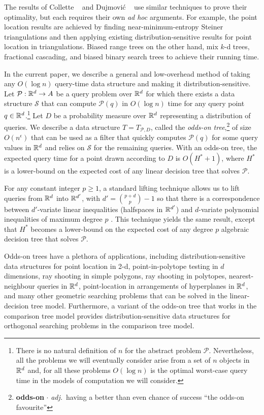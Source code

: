 \documentclass{patmorin}
\newcommand{\eps}{\epsilon}
\begin{document}
The results of Collette \etal\ \cite{cdilm08,cdilm09} and Dujmovi\'c
\etal\ \cite{dhm09} use similar techniques to prove their optimality,
but each requires their own \textit{ad hoc} arguments.  For example, the point
location results are achieved by finding near-minimum-entropy Steiner
triangulations and then applying existing distribution-sensitive results
for point location in triangulations.  Biased range trees on the other
hand, mix $k$-d trees, fractional cascading, and biased binary search
trees to achieve their running time.

In the current paper, we describe a general and low-overhead method
of taking any $O(\log n)$ query-time data structure and making it
distribution-sensitive.  Let $\mathcal{P}:\mathbb{R}^d\rightarrow A$ be a query
problem over $\mathbb{R}^d$ for which there exists a data structure $\mathcal{S}$
that can compute $\mathcal{P}(q)$ in $O(\log n)$ time for any query
point $q\in\mathbb{R}^d$.\footnote{There is no natural definition of $n$ for
the abstract problem $\mathcal{P}$.  Nevertheless, all the problems
we will eventually consider arise from a set of $n$ objects in $\mathbb{R}^d$
and, for all these problems $O(\log n)$ is the optimal worst-case
query time in the models of computation we will consider.}  Let $D$
be a probability measure over $\mathbb{R}^d$ representing a distribution
of queries.  We describe a data structure $T=T_{\mathcal{P},D}$,
called the \emph{odds-on tree},\footnote{\textbf{odds-on} $\cdot$
\textit{adj.}\ having a better than even chance of success ``the odds-on
favourite''}  of size $O(n^\eps)$ that can be used as a filter that
quickly computes $\mathcal{P}(q)$ for some query values in $\mathbb{R}^d$ and
relies on $\mathcal{S}$ for the remaining queries.  With an odds-on tree,
the expected query time for a point drawn according to $D$ is $O(H^*+1)$,
where $H^*$ is a lower-bound on the expected cost of any linear decision
tree that solves $\mathcal{P}$.

For any constant integer $p\ge 1$, a standard lifting technique allows us
to lift queries from $\mathbb{R}^d$ into $\mathbb{R}^{d'}$, with $d'={p+d \choose p}-1$
so that there is a correspondence between $d'$-variate linear inequalities
(halfspaces in $\mathbb{R}^{d'}$) and $d$-variate polynomial inequalities of
maximum degree $p$ \cite{yy85}.  This technique yields the same result,
except that $H^*$ becomes a lower-bound on the expected cost of any
degree $p$ algebraic decision tree that solves $\mathcal{P}$.

Odds-on trees have a plethora of applications, including
distribution-sensitive data structures for point location in 2-d,
point-in-polytope testing in $d$ dimensions, ray shooting in simple
polygons, ray shooting in polytopes, nearest-neighbour queries in $\mathbb{R}^d$,
point-location in arrangements of hyperplanes in $\mathbb{R}^d$, and many other
geometric searching problems that can be solved in the linear-decision
tree model.  Furthermore, a variant of the odds-on tree that works in
the comparison tree model provides distribution-sensitive data structures
for orthogonal searching problems in the comparison tree model.
\end{document}
